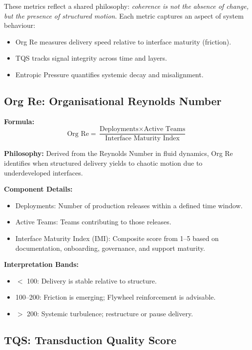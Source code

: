 \documentclass[12pt]{article}
\begin{document}
These metrics reflect a shared philosophy: \textit{coherence is not the absence of change, but the presence of structured motion}. Each metric captures an aspect of system behaviour:
\begin{itemize}
    \item Org Re measures delivery speed relative to interface maturity (friction).
    \item TQS tracks signal integrity across time and layers.
    \item Entropic Pressure quantifies systemic decay and misalignment.
\end{itemize}

\subsection{Org Re: Organisational Reynolds Number}

\textbf{Formula:}
\[
\text{Org Re} = \frac{\text{Deployments} \times \text{Active Teams}}{\text{Interface Maturity Index}}
\]

\textbf{Philosophy:} Derived from the Reynolds Number in fluid dynamics, Org Re identifies when structured delivery yields to chaotic motion due to underdeveloped interfaces.

\textbf{Component Details:}
\begin{itemize}
    \item Deployments: Number of production releases within a defined time window.
    \item Active Teams: Teams contributing to those releases.
    \item Interface Maturity Index (IMI): Composite score from 1–5 based on documentation, onboarding, governance, and support maturity.
\end{itemize}

\textbf{Interpretation Bands:}
\begin{itemize}
    \item $<$ 100: Delivery is stable relative to structure.
    \item 100--200: Friction is emerging; Flywheel reinforcement is advisable.
    \item $>$ 200: Systemic turbulence; restructure or pause delivery.
\end{itemize}

\subsection{TQS: Transduction Quality Score}
\end{document}
